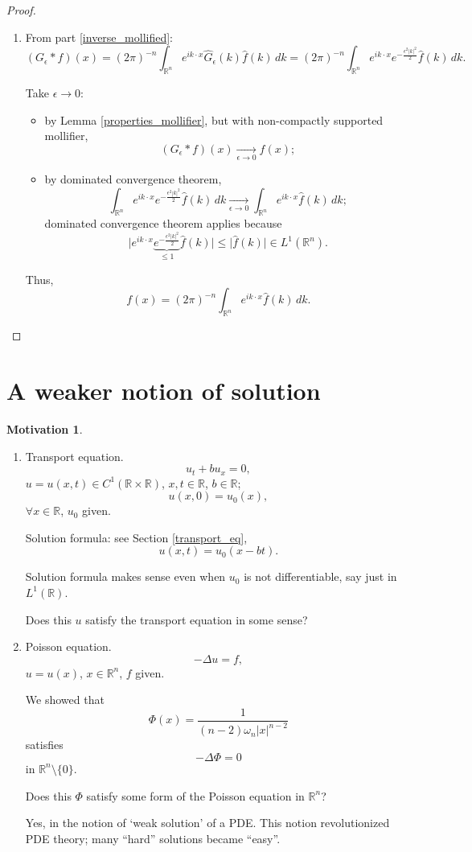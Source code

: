 \documentclass[12pt]{article}
\theoremstyle{definition}
\newtheorem*{motivation}{Motivation}
\begin{document}
\begin{proof}
\begin{enumerate}[label=\arabic*.]
\item From part \ref{inverse_mollified}:
\[(G_\epsilon*f)(x)=(2\pi)^{-n}\int_{\mathbb R^n}e^{ik\cdot x}\widehat G_\epsilon(k)\hat f(k)\,dk=(2\pi)^{-n}\int_{\mathbb R^n}e^{ik\cdot x}e^{-\frac{\epsilon^2|k|^2}2}\hat f(k)\,dk.\]

Take $\epsilon\to0$:
\begin{itemize}
\item by Lemma \ref{properties_mollifier}, but with non-compactly supported mollifier,
\[(G_\epsilon*f)(x)\xrightarrow[\epsilon\to0]{}f(x);\]
\item by dominated convergence theorem,
\[\int_{\mathbb R^n}e^{ik\cdot x}e^{-\frac{\epsilon^2|k|^2}2}\hat f(k)\,dk\xrightarrow[\epsilon\to0]{}\int_{\mathbb R^n}e^{ik\cdot x}\hat f(k)\,dk;\]
dominated convergence theorem applies because
\[\Big|e^{ik\cdot x}\underbrace{e^{-\frac{\epsilon^2|k|^2}2}}_{\leq1}\hat f(k)\Big|\leq\big|\hat f(k)\big|\in L^1(\mathbb R^n).\]
\end{itemize}

Thus,
\[f(x)=(2\pi)^{-n}\int_{\mathbb R^n}e^{ik\cdot x}\hat f(k)\,dk.\]
\end{enumerate}
\end{proof}

\section{A weaker notion of solution}
\begin{motivation}
\begin{enumerate}[label=(\arabic*)]
\item Transport equation.
\[u_t+bu_x=0,\]
$u=u(x,t)\in C^1(\mathbb R\times\mathbb R)$, $x,t\in\mathbb R$, $b\in\mathbb R$;
\[u(x,0)=u_0(x),\]
$\forall x\in\mathbb R$, $u_0$ given.

Solution formula: see Section \ref{transport_eq},
\[u(x,t)=u_0(x-bt).\]

Solution formula makes sense even when $u_0$ is not differentiable, say just in $L^1(\mathbb R)$.

Does this $u$ satisfy the transport equation in some sense?

\item Poisson equation.
\[-\Delta u=f,\]
$u=u(x)$, $x\in\mathbb R^n$, $f$ given.

We showed that
\[\Phi(x)=\frac1{(n-2)\omega_n|x|^{n-2}}\]
satisfies
\[-\Delta\Phi=0\]
in $\mathbb R^n\setminus\{0\}$.

Does this $\Phi$ satisfy some form of the Poisson equation in $\mathbb R^n$?

Yes, in the notion of `weak solution' of a PDE. This notion revolutionized PDE theory; many ``hard'' solutions became ``easy''.
\end{enumerate}
\end{motivation}
\end{document}
